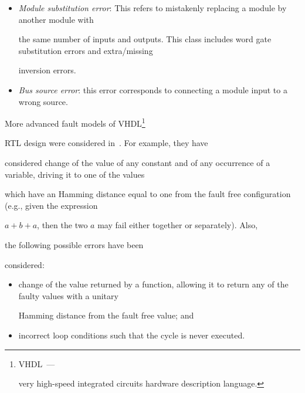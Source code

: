 \begin{multicols}{2}
\begin{itemize}
if all lines in the bus are


stuck at logic level~0 or~1. This generalization of the standard


single stuck line (SSL) model was introduced in~\cite{6bar} in the


context of physical fault testing.


\item \textit{Module substitution error}: This refers to mistakenly replacing a module by another module with


the same number of inputs and outputs. This class includes word gate substitution errors and extra/missing


inversion errors.


\item \textit{Bus source error}: this error corresponds to connecting a module input to a wrong source.


\end{itemize}





   More advanced fault models of VHDL\footnote{VHDL~---


very high-speed integrated circuits hardware description language.}


RTL design were considered in~\cite{7bar}. For example, they have


considered change of the value of any constant and of any occurrence of a variable, driving it to one of the values


which have an Hamming distance equal to one from the fault free configuration (e.g., given the expression


$a+b+a$, then the two $a$ may fail either together or sepa\-rate\-ly). Also,


the following possible errors have been


considered:


   \begin{itemize}


\item change of the value returned by a function, allowing it to return any of the faulty values with a unitary


Hamming distance from the fault free value; and


\item incorrect  loop conditions such that the cycle is never executed.


\end{itemize}






\end{multicols}
